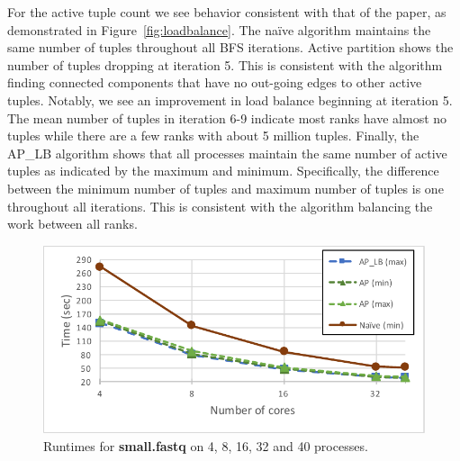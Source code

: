\documentclass[11pt]{elsarticle}
\begin{document}
For the active tuple count we see behavior consistent with that of the paper, as demonstrated in Figure~\ref{fig:loadbalance}. The na{\"i}ve algorithm maintains the same number of tuples throughout all BFS iterations. Active partition shows the number of tuples dropping at iteration 5. This is consistent with the algorithm finding connected components that have no out-going edges to other active tuples. Notably, we see an improvement in load balance beginning at iteration 5. The mean number of tuples in iteration 6-9 indicate most ranks have almost no tuples while there are a few ranks with about 5 million tuples. Finally, the AP\_LB algorithm shows that all processes maintain the same number of active tuples as indicated by the maximum and minimum. Specifically, the difference between the minimum number of tuples and maximum number of tuples is one throughout all iterations. This is consistent with the algorithm balancing the work between all ranks.
\begin{figure}[htp]
\centering
\includegraphics[width=.9\textwidth]{allruntimes}
\caption{Runtimes for \textbf{small.fastq} on 4, 8, 16, 32 and 40 processes.}
\label{fig:runtimes}
\end{figure}
\end{document}
